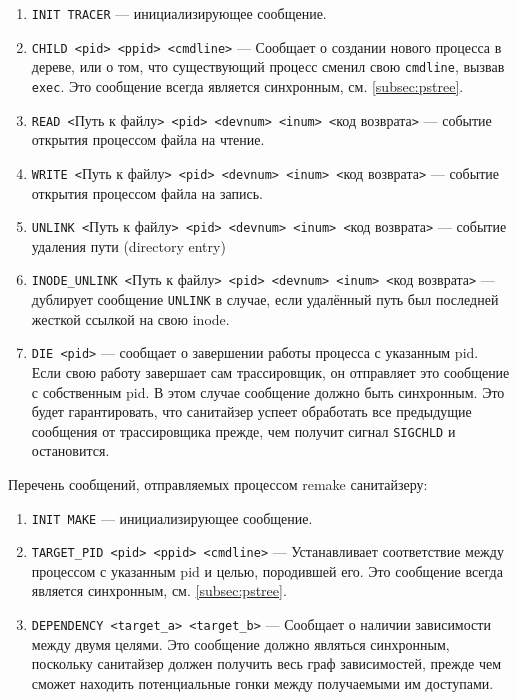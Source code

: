 \begin{enumerate}
    \item \texttt{INIT TRACER} --- инициализирующее сообщение.
    \item \texttt{CHILD <pid> <ppid> <cmdline>} --- Сообщает о создании нового процесса в дереве, или о том, что существующий процесс сменил свою \texttt{cmdline}, вызвав \texttt{exec}. Это сообщение всегда является синхронным, см. \ref{subsec:pstree}.
    \item \texttt{READ <}Путь к файлу\texttt{> <pid> <devnum> <inum> <}код возврата\texttt{>} --- событие открытия процессом файла на чтение.
    \item \texttt{WRITE <}Путь к файлу\texttt{> <pid> <devnum> <inum> <}код возврата\texttt{>}
    --- событие открытия процессом файла на запись.
    \item \texttt{UNLINK <}Путь к файлу\texttt{> <pid> <devnum> <inum> <}код возврата\texttt{>} --- событие удаления пути (directory entry)
    \item \texttt{INODE\_UNLINK <}Путь к файлу\texttt{> <pid> <devnum> <inum> <}код возврата\texttt{>} --- дублирует сообщение \texttt{UNLINK} в случае, если удалённый путь был последней жесткой ссылкой на свою inode.
    \item \texttt{DIE <pid>} --- сообщает о завершении работы процесса с указанным pid. Если свою работу завершает сам трассировщик, он отправляет это сообщение с собственным pid. В этом случае сообщение должно быть синхронным. Это будет гарантировать, что санитайзер успеет обработать все предыдущие сообщения от трассировщика прежде, чем получит сигнал \texttt{SIGCHLD} и остановится.
\end{enumerate}

Перечень сообщений, отправляемых процессом remake санитайзеру:

\begin{enumerate}
    \item \texttt{INIT MAKE} --- инициализирующее сообщение.
    \item \texttt{TARGET\_PID <pid> <ppid> <cmdline>} --- Устанавливает соответствие между процессом с указанным pid и целью, породившей его. Это сообщение всегда является синхронным, см. \ref{subsec:pstree}.
    \item \texttt{DEPENDENCY <target\_a> <target\_b>} --- Сообщает о наличии зависимости между двумя целями. Это сообщение должно являться синхронным, поскольку санитайзер должен получить весь граф зависимостей, прежде чем сможет находить потенциальные гонки между получаемыми им доступами.
\end{enumerate}

